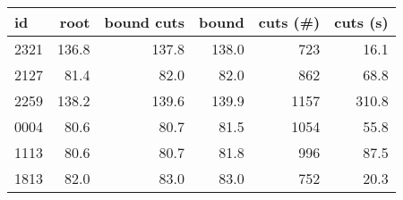 \begin{tabular}{lrrrrr}
\toprule
   id &  root &  bound cuts &  bound &  cuts (\#) &  cuts (s) \\
\midrule
 2321 & 136.8 &       137.8 &  138.0 &       723 &      16.1 \\
 2127 &  81.4 &        82.0 &   82.0 &       862 &      68.8 \\
 2259 & 138.2 &       139.6 &  139.9 &      1157 &     310.8 \\
 0004 &  80.6 &        80.7 &   81.5 &      1054 &      55.8 \\
 1113 &  80.6 &        80.7 &   81.8 &       996 &      87.5 \\
 1813 &  82.0 &        83.0 &   83.0 &       752 &      20.3 \\
\bottomrule
\end{tabular}
